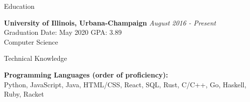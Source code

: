 \documentclass{resume} %
\begin{document}

    \begin{rSection}{Education}

{\bf University of Illinois, Urbana-Champaign} \hfill {\em August 2016 - Present} 
\\ Graduation Date: May 2020 \hfill { GPA: 3.89}
\\ Computer Science


        \end{rSection}

        \begin{rSection}{Technical Knowledge}

            \textbf{Programming Languages (order of proficiency):}\\  Python, JavaScript, Java, HTML/CSS, React, SQL, Rust, C/C++, Go, Haskell, Ruby, Racket

            \end{rSection}

\end{document}
